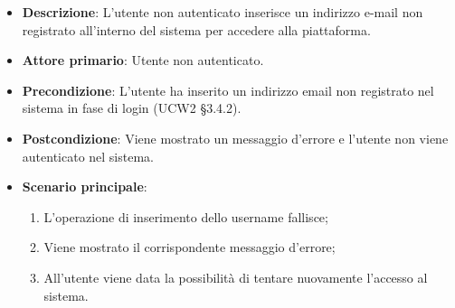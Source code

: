 \begin{itemize}
\item \textbf{Descrizione}: L'utente non autenticato inserisce un indirizzo e-mail non registrato all'interno del sistema per accedere alla piattaforma.
\item \textbf{Attore primario}: Utente non autenticato.
\item \textbf{Precondizione}: L'utente ha inserito un indirizzo email non registrato nel sistema in fase di login (UCW2 §3.4.2).
\item \textbf{Postcondizione}: Viene mostrato un messaggio d'errore e l'utente non viene autenticato nel sistema.

\item \textbf{Scenario principale}:
\begin{enumerate}
\item L'operazione di inserimento dello username fallisce;
\item Viene mostrato il corrispondente messaggio d'errore;
\item All'utente viene data la possibilità di tentare nuovamente l'accesso al sistema.
\end{enumerate}
\end{itemize}


